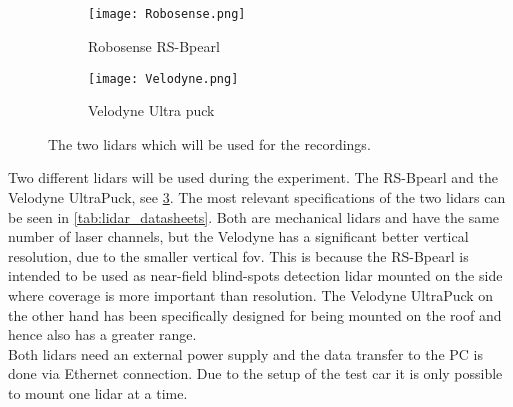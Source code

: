 \subsection{}
\begin{figure}[htbp]
	\centering
	\begin{subfigure}{0.4\textwidth}
		\centering
		\texttt{[image: Robosense.png]}
		\caption[The \glspl{lidar} used in the experiment]{Robosense RS-Bpearl \cite{RoboSense2020}}
		\label{fig:lidar_robosense}
	\end{subfigure}
	\begin{subfigure}{0.4\textwidth}
		\centering
		\texttt{[image: Velodyne.png]}
		\caption{Velodyne Ultra puck \cite{Velodyne2018}}
		\label{fig:lidar_velodyne}
	\end{subfigure}
	\caption{The two \glspl{lidar} which will be used for the recordings.}
	\label{fig:lidars_used}
\end{figure}
Two different \glspl{lidar} will be used during the experiment.
The RS-Bpearl and the Velodyne UltraPuck, see \cref{fig:lidars_used}.
The most relevant specifications of the two \glspl{lidar} can be seen in \cref{tab:lidar_datasheets}.
Both are mechanical \glspl{lidar} and have the same number of laser channels, but the Velodyne has a significant better vertical resolution, due to the smaller vertical \gls{fov}.
This is because the RS-Bpearl is intended to be used as near-field blind-spots detection \gls{lidar} mounted on the side where coverage is more important than resolution.
The Velodyne UltraPuck on the other hand has been specifically designed for being mounted on the roof and hence also has a greater range.\\
Both \glspl{lidar} need an external power supply and the data transfer to the PC is done via Ethernet connection.
Due to the setup of the test car it is only possible to mount one \gls{lidar} at a time.

